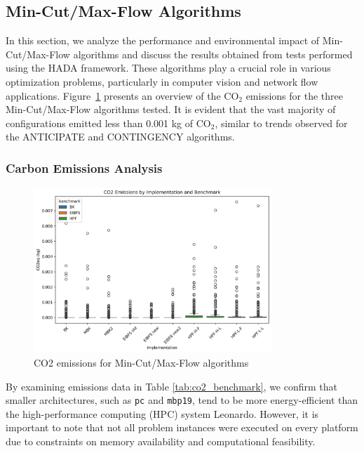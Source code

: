 \documentclass[a4paper,singleside,12pt]{report} %
\begin{document}
\subsection{Min-Cut/Max-Flow Algorithms}

In this section, we analyze the performance and environmental impact of Min-Cut/Max-Flow algorithms and discuss the results obtained from tests performed using the HADA framework. 
These algorithms play a crucial role in various optimization problems, particularly in computer vision and network flow applications. Figure~\ref{fig:max_flow_emissions} presents an 
overview of the CO$_2$ emissions for the three Min-Cut/Max-Flow algorithms tested. It is evident that the vast majority of configurations emitted less than 0.001 kg of CO$_2$, 
similar to trends observed for the ANTICIPATE and CONTINGENCY algorithms.

\subsubsection{Carbon Emissions Analysis}

\begin{figure}[h!]
    \centering
    \includegraphics[width=0.8\textwidth]{imgs/max_flow_emissions.png}
    \caption{CO2 emissions for Min-Cut/Max-Flow algorithms}
    \label{fig:max_flow_emissions}
\end{figure}

By examining emissions data in Table \ref{tab:co2_benchmark}, we confirm that smaller architectures, such as \verb|pc| and \verb|mbp19|, tend to be more energy-efficient than the 
high-performance computing (HPC) system Leonardo. However, it is important to note that not all problem instances were executed on every platform due to constraints on memory 
availability and computational feasibility. 
\end{document}
